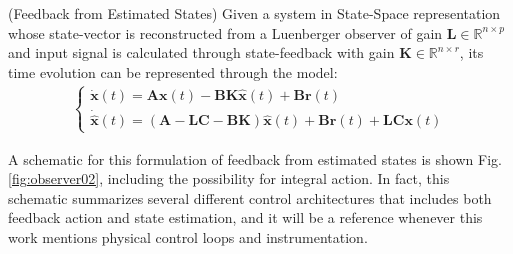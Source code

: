 \documentclass[a4paper,11pt]{book}
\numberwithin{figure}{chapter}
\numberwithin{equation}{chapter}
\numberwithin{table}{chapter}
\theoremstyle{definition}
\newtheorem{definition}{Definition}[chapter]
\newcounter{boxed-theorem}
\newcounter{boxed-definition}
\newenvironment{boxed-definition}[1]
{\begin{shaded} \begin{definition}{#1}}
{\end{definition} \end{shaded}}
\begin{document}
\begin{boxed-definition}{(Feedback from Estimated States)} \label{def:fdbckLuenberger}
	Given a system in State-Space representation whose state-vector is reconstructed from a Luenberger observer of gain $\bm{L} \in \mathbb{R}^{n \times p}$ and input signal is calculated through state-feedback with gain $\bm{K} \in \mathbb{R}^{n \times r}$, its time evolution can be represented through the model:
	\begin{align} \label{eq:fdbckLuenberger01}
	\begin{cases}
		\dot{\bm{x}}(t) = \bm{A} \bm{x}(t) - \bm{B} \bm{K} \hat{\bm{x}}(t) + \bm{B} \bm{r}(t) \\
		\dot{\hat{\bm{x}}}(t) = \left(\bm{A} - \bm{L} \bm{C} - \bm{B} \bm{K} \right) \hat{\bm{x}}(t) + \bm{B} \bm{r}(t) + \bm{L} \bm{C} \bm{x}(t) 
	\end{cases}
	\end{align}
\end{boxed-definition} 

A schematic for this formulation of feedback from estimated states is shown Fig. \ref{fig:observer02}, including the possibility for integral action. In fact, this schematic summarizes several different control architectures that includes both feedback action and state estimation, and it will be a reference whenever this work mentions physical control loops and instrumentation.
\end{document}
